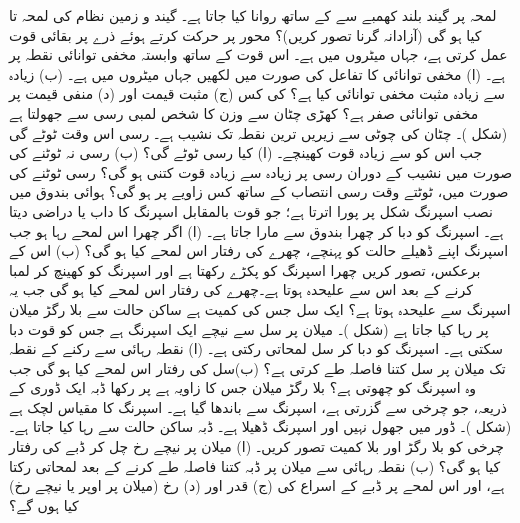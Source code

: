لمحہ  پر   گیند     بلند  کھمبے   سے  کے ساتھ روانا کیا جاتا ہے۔  گیند و زمین نظام کی  لمحہ  تا   کیا ہو گی (آزادانہ گرنا تصور کریں)؟
محور  پر حرکت کرتے ہوئے  ذرے پر بقائی قوت  عمل   کرتی ہے، جہاں  میٹروں میں ہے۔ اس قوت کے ساتھ  وابستہ مخفی توانائی  نقطہ  پر  ہے۔ (ا)  مخفی توانائی  کا تفاعل  کی صورت میں لکھیں جہاں   میٹروں میں ہے۔ (ب)  زیادہ سے زیادہ مثبت مخفی توانائی کیا ہے؟   کی  کس (ج) مثبت قیمت اور (د) منفی قیمت پر مخفی توانائی صفر ہے؟
کھڑی چٹان سے    وزن کا شخص   لمبی رسی  سے جھولتا ہے (شکل )۔  چٹان کی چوٹی سے     زیریں ترین نقطہ تک نشیب    ہے۔ رسی اس وقت ٹوٹے  گی جب اس  کو    سے زیادہ قوت  کھینچے۔ (ا) کیا رسی ٹوٹے گی؟ (ب)  رسی نہ ٹوٹنے کی صورت میں نشیب کے دوران رسی پر زیادہ سے زیادہ قوت کتنی ہو گی؟  رسی ٹوٹنے کی صورت میں، ٹوٹتے وقت رسی انتصاب کے ساتھ کس زاویے پر ہو گی؟
ہوائی بندوق میں  نصب اسپرنگ شکل  پر پورا  اترتا ہے؛ جو قوت بالمقابل اسپرنگ کا داب یا   دراضی   دیتا ہے۔ اسپرنگ کو  دبا کر  چھرا بندوق سے  مارا جاتا ہے۔ (ا)  اگر   چھرا اس  لمحے   رہا  ہو جب اسپرنگ اپنے ڈھیلے  حالت کو پہنچے، چھرے کی رفتار اس  لمحے کیا ہو گی؟ (ب)  اس کے برعکس،  تصور کریں چھرا  اسپرنگ  کو پکڑے رکھتا ہے اور    اسپرنگ  کو  کھینچ کر    لمبا کرنے کے بعد اس سے علیحدہ ہوتا ہے۔چھرے کی رفتار اس لمحے کیا ہو گی جب یہ اسپرنگ سے علیحدہ ہوتا ہے؟
ایک سل جس کی کمیت  ہے ساکن حالت سے  بلا رگڑ  میلان پر رہا کیا جاتا ہے (شکل )۔ میلان پر سل سے نیچے  ایک اسپرنگ ہے جس کو  قوت  دبا سکتی ہے۔ اسپرنگ کو  دبا کر سل لمحاتی رکتی ہے۔ (ا)    نقطہ رہائی سے رکنے کے نقطہ تک میلان پر سل کتنا فاصلہ طے کرتی ہے؟ (ب)سل کی رفتار اس لمحے کیا ہو گی جب وہ   اسپرنگ کو چھوتی ہے؟
بلا رگڑ میلان جس کا  زاویہ  ہے پر  رکھا  ڈبہ    ایک ڈوری کے ذریعہ،  جو چرخی سے گزرتی ہے،   اسپرنگ سے باندھا گیا ہے۔ اسپرنگ کا مقیاس لچک  ہے (شکل )۔   ڈور  میں جھول  نہیں  اور  اسپرنگ  ڈھیلا ہے۔ ڈبہ ساکن حالت سے رہا کیا جاتا ہے۔ چرخی کو بلا رگڑ اور بلا کمیت تصور کریں۔ (ا)  میلان پر   نیچے  رخ چل کر ڈبے کی رفتار کیا ہو گی؟ (ب) نقطہ رہائی سے میلان  پر ڈبہ کتنا فاصلہ طے کرنے کے بعد لمحاتی رکتا ہے، اور  اس لمحے  پر ڈبے  کے  اسراع کی (ج)  قدر اور (د) رخ (میلان پر اوپر یا نیچے رخ) کیا ہوں گے؟

